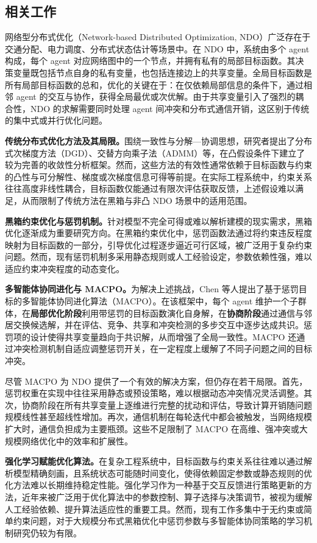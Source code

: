 \documentclass[12pt]{ctexart}
\begin{document}
\subsection{相关工作}\label{ux76f8ux5173ux5de5ux4f5c}

网络型分布式优化（Network-based Distributed Optimization,
NDO）广泛存在于交通分配、电力调度、分布式状态估计等场景中。在 NDO
中，系统由多个 agent 构成，每个 agent
对应网络图中的一个节点，并拥有私有的局部目标函数。其决策变量既包括节点自身的私有变量，也包括连接边上的共享变量。全局目标函数是所有局部目标函数的总和，优化的关键在于：在仅依赖局部信息的条件下，通过相邻
agent
的交互与协作，获得全局最优或次优解。由于共享变量引入了强烈的耦合性，NDO
的求解需要同时处理 agent
间冲突和分布式通信开销，这区别于传统的集中式或并行优化问题。

\textbf{传统分布式优化方法及其局限。}围绕一致性与分解—协调思想，研究者提出了分布式次梯度方法（DGD）、交替方向乘子法（ADMM）等，在凸假设条件下建立了较为完善的收敛性分析框架。然而，这些方法的有效性通常依赖于目标函数与约束的凸性与可分解性、梯度或次梯度信息可得等前提。在实际工程系统中，约束关系往往高度非线性耦合，目标函数仅能通过有限次评估获取反馈，上述假设难以满足，从而限制了传统方法在黑箱与非凸 NDO 场景中的适用范围。

\textbf{黑箱约束优化与惩罚机制。}针对模型不完全可得或难以解析建模的现实需求，黑箱优化逐渐成为重要研究方向。在黑箱约束优化中，惩罚函数法通过将约束违反程度映射为目标函数的一部分，引导优化过程逐步逼近可行区域，被广泛用于复杂约束问题。然而，现有惩罚机制多采用静态规则或人工经验设定，参数依赖性强，难以适应约束冲突程度的动态变化。

\textbf{多智能体协同进化与 MACPO。}为解决上述挑战，Chen
等人提出了基于惩罚目标的多智能体协同进化算法（MACPO）。在该框架中，每个
agent
维护一个子群体，在\textbf{局部优化阶段}利用带惩罚的目标函数演化自身解，在\textbf{协商阶段}通过通信与邻居交换候选解，并在评估、竞争、共享和冲突检测的多步交互中逐步达成共识。惩罚项的设计使得共享变量趋向于共识解，从而增强了全局一致性。MACPO
还通过冲突检测机制自适应调整惩罚开关，在一定程度上缓解了不同子问题之间的目标冲突。

尽管 MACPO 为 NDO
提供了一个有效的解决方案，但仍存在若干局限。首先，惩罚权重在实现中往往采用静态或预设策略，难以根据动态冲突情况灵活调整。其次，协商阶段在所有共享变量上逐维进行完整的扰动和评估，导致计算开销随问题规模线性甚至超线性增加。再次，通信机制在每轮迭代中都会被触发，当网络规模扩大时，通信负担成为主要瓶颈。这些不足限制了
MACPO 在高维、强冲突或大规模网络优化中的效率和扩展性。

\textbf{强化学习赋能优化算法。}在复杂工程系统中，目标函数与约束关系往往难以通过解析模型精确刻画，且系统状态可能随时间变化，使得依赖固定参数或静态规则的优化方法难以长期维持稳定性能。强化学习作为一种基于交互反馈进行策略更新的方法，近年来被广泛用于优化算法中的参数控制、算子选择与决策调节，被视为缓解人工经验依赖、提升算法适应性的重要工具。然而，现有工作多集中于无约束或简单约束问题，对于大规模分布式黑箱优化中惩罚参数与多智能体协同策略的学习机制研究仍较为有限。
\end{document}
